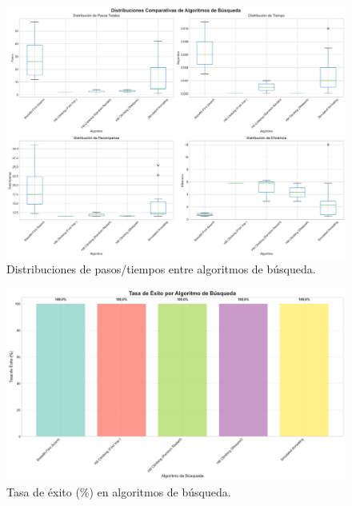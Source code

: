 \documentclass[12pt, oneside, openany]{book}
\begin{document}
\begin{figure}[H]
    \centering
    \includegraphics[width=1\textwidth]{search_distribuciones_comparacion.png}
    \caption{Distribuciones de pasos/tiempos entre algoritmos de búsqueda.}
    \label{fig:search_distribuciones}
\end{figure}

\begin{figure}[H]
    \centering
    \includegraphics[width=1\textwidth]{search_exito_comparacion.png}
    \caption{Tasa de éxito (\%) en algoritmos de búsqueda.}
    \label{fig:search_exito}
\end{figure}
\end{document}
